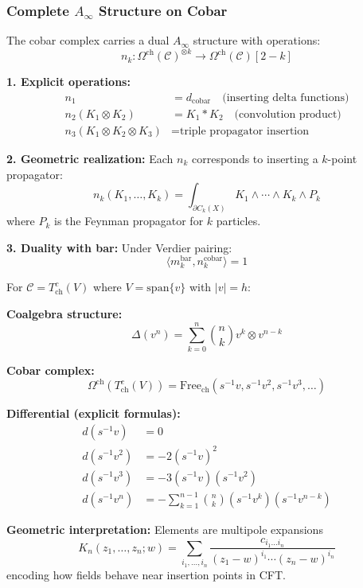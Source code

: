 \subsubsection{Complete $A_\infty$ Structure on Cobar}

\begin{theorem}
The cobar complex carries a dual $A_\infty$ structure with operations:
$$n_k: \Omega^{\text{ch}}(\mathcal{C})^{\otimes k} \to \Omega^{\text{ch}}(\mathcal{C})[2-k]$$

\textbf{1. Explicit operations:}
\begin{align}
n_1 &= d_{\text{cobar}} \quad \text{(inserting delta functions)} \\
n_2(K_1 \otimes K_2) &= K_1 * K_2 \quad \text{(convolution product)} \\
n_3(K_1 \otimes K_2 \otimes K_3) &= \text{triple propagator insertion}
\end{align}

\textbf{2. Geometric realization:} Each $n_k$ corresponds to inserting a $k$-point propagator:
$$n_k(K_1, \ldots, K_k) = \int_{\partial C_k(X)} K_1 \wedge \cdots \wedge K_k \wedge P_k$$
where $P_k$ is the Feynman propagator for $k$ particles.

\textbf{3. Duality with bar:} Under Verdier pairing:
$$\langle m_k^{\text{bar}}, n_k^{\text{cobar}} \rangle = 1$$
\end{theorem}

\begin{example}
For $\mathcal{C} = T^c_{\text{ch}}(V)$ where $V = \text{span}\{v\}$ with $|v| = h$:

\textbf{Coalgebra structure:}
$$\Delta(v^n) = \sum_{k=0}^n \binom{n}{k} v^k \otimes v^{n-k}$$

\textbf{Cobar complex:}
$$\Omega^{\text{ch}}(T^c_{\text{ch}}(V)) = \text{Free}_{\text{ch}}(s^{-1}v, s^{-1}v^2, s^{-1}v^3, \ldots)$$

\textbf{Differential (explicit formulas):}
\begin{align}
d(s^{-1}v) &= 0 \\
d(s^{-1}v^2) &= -2(s^{-1}v)^2 \\
d(s^{-1}v^3) &= -3(s^{-1}v)(s^{-1}v^2) \\
d(s^{-1}v^n) &= -\sum_{k=1}^{n-1} \binom{n}{k}(s^{-1}v^k)(s^{-1}v^{n-k})
\end{align}

\textbf{Geometric interpretation:} Elements are multipole expansions
$$K_n(z_1, \ldots, z_n; w) = \sum_{i_1, \ldots, i_n} \frac{c_{i_1\ldots i_n}}{(z_1 - w)^{i_1} \cdots (z_n - w)^{i_n}}$$
encoding how fields behave near insertion points in CFT.
\end{example}

